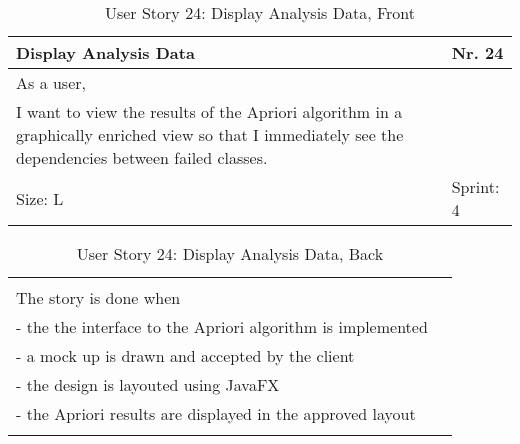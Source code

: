 \begin{table}[H]
  \caption{User Story 24: Display Analysis Data, Front}
  \label{Story_24_Front}
  \centering
  \begin{tabular}{|p{9cm} p{2cm}|}
	\hline  	
  	Display Analysis Data & Nr. 24 \\ 
  	\hline
  	As a user, &    \\ 
  	I want to view the results of the Apriori algorithm in a graphically enriched view so that I immediately see the dependencies between failed classes. &    \\ 
  	Size: L & Sprint: 4 \\ 
  	\hline
  \end{tabular}
\end{table}
\begin{table}[H]
  \caption{User Story 24: Display Analysis Data, Back}
  \label{Story_24_Back}
  \centering
  \begin{tabular}{|p{10cm} p{1cm}|}
  \hline
  	  &    \\ 
  	The story is done when &    \\ 
  	 - the the interface to the Apriori algorithm is implemented & \\ 
  	 - a mock up is drawn and accepted by the client & \\ 
  	 - the design is layouted using JavaFX & \\ 
  	 - the Apriori results are displayed in the approved layout & \\ 
  	 
  	  &  
  	   \\ 
  	\hline
  \end{tabular}
\end{table}

\ \\ 

